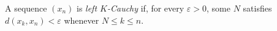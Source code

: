 
A sequence $(x_n)$ is \emph{left $K$-Cauchy} if, for every $\varepsilon>0$, some $N$ satisfies $d(x_k,x_n)<\varepsilon$ whenever $N\le k\le n$.
